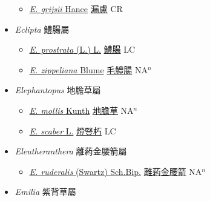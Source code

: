 \begin{itemize}
  \begin{itemize}
        \item[] \href{http://www.theplantlist.org/tpl1.1/search?q=Echinops+grijsii}{\textit{E. grijsii} Hance}   \href{\detokenize{http://taibnet.sinica.edu.tw/chi/taibnet_species_list.php?T2=漏盧&T2_new_value=true&fr=y}}{漏盧} CR
  \end{itemize}
 \item[] \textit{Eclipta} 鱧腸屬
                    
  \begin{itemize}
        \item[] \href{http://www.theplantlist.org/tpl1.1/search?q=Eclipta+prostrata}{\textit{E. prostrata} (L.) L.}   \href{\detokenize{http://taibnet.sinica.edu.tw/chi/taibnet_species_list.php?T2=鱧腸&T2_new_value=true&fr=y}}{鱧腸} LC
        \item[] \href{http://www.theplantlist.org/tpl1.1/search?q=Eclipta+zippeliana}{\textit{E. zippeliana} Blume}   \href{\detokenize{http://taibnet.sinica.edu.tw/chi/taibnet_species_list.php?T2=毛鱧腸&T2_new_value=true&fr=y}}{毛鱧腸} NA$^n$
  \end{itemize}
 \item[] \textit{Elephantopus} 地膽草屬
                    
  \begin{itemize}
        \item[] \href{http://www.theplantlist.org/tpl1.1/search?q=Elephantopus+mollis}{\textit{E. mollis} Kunth}   \href{\detokenize{http://taibnet.sinica.edu.tw/chi/taibnet_species_list.php?T2=地膽草&T2_new_value=true&fr=y}}{地膽草} NA$^n$
        \item[] \href{http://www.theplantlist.org/tpl1.1/search?q=Elephantopus+scaber}{\textit{E. scaber} L.}   \href{\detokenize{http://taibnet.sinica.edu.tw/chi/taibnet_species_list.php?T2=燈豎朽&T2_new_value=true&fr=y}}{燈豎朽} LC
  \end{itemize}
 \item[] \textit{Eleutheranthera} 離葯金腰箭屬
                    
  \begin{itemize}
        \item[] \href{http://www.theplantlist.org/tpl1.1/search?q=Eleutheranthera+ruderalis}{\textit{E. ruderalis} (Swartz) Sch.Bip.}   \href{\detokenize{http://taibnet.sinica.edu.tw/chi/taibnet_species_list.php?T2=離葯金腰箭&T2_new_value=true&fr=y}}{離葯金腰箭} NA$^n$
  \end{itemize}
 \item[] \textit{Emilia} 紫背草屬
                    

\end{itemize}
